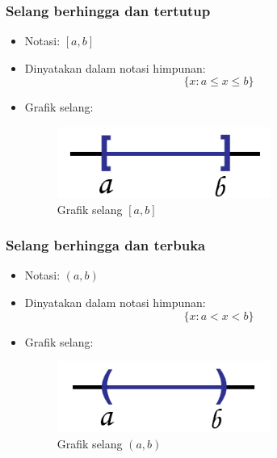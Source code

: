 \documentclass[pdflatex,compress,mathserif]{beamer}
\begin{document}
		\begin{frame}
			\frametitle{Selang berhingga dan tertutup}
			\begin{itemize}
				\item Notasi: $ [a,b] $
				\item Dinyatakan dalam notasi himpunan:
				\begin{equation}
					\{x:a \leq x \leq b\}
				\end{equation}
				\item Grafik selang:
				\begin{figure}
					\centering
					\includegraphics[width=0.5\linewidth]{pict/02}
					\caption{Grafik selang $[a,b]$}
					\label{fig:02}
				\end{figure}
			\end{itemize}
		\end{frame}
	
		\begin{frame}
			\frametitle{Selang berhingga dan terbuka}
			\begin{itemize}
				\item Notasi: $ (a,b) $
				\item Dinyatakan dalam notasi himpunan:
				\begin{equation}
					\{x:a < x < b\}
				\end{equation}
				\item Grafik selang:
				\begin{figure}
					\centering
					\includegraphics[width=0.5\linewidth]{pict/03}
					\caption{Grafik selang $(a,b)$}
					\label{fig:03}
				\end{figure}
			\end{itemize}
		\end{frame}
	
\end{document}
